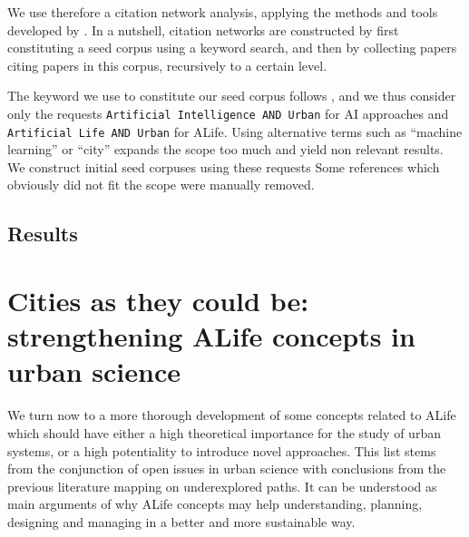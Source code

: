 \documentclass[letterpaper]{article}
\begin{document}
We use therefore a citation network analysis, applying the methods and tools developed by \cite{raimbault2019exploration}. In a nutshell, citation networks are constructed by first constituting a seed corpus using a keyword search, and then by collecting papers citing papers in this corpus, recursively to a certain level.

The keyword we use to constitute our seed corpus follows , and we thus consider only the requests \texttt{Artificial Intelligence AND Urban} for AI approaches and \texttt{Artificial Life AND Urban} for ALife. Using alternative terms such as ``machine learning'' or ``city'' expands the scope too much and yield non relevant results.
We construct initial seed corpuses using these requests
Some references which obviously did not fit the scope were manually removed. 


\subsection{Results}





\section{Cities as they could be: strengthening ALife concepts in urban science}


We turn now to a more thorough development of some concepts related to ALife which should have either a high theoretical importance for the study of urban systems, or a high potentiality to introduce novel approaches. This list stems from the conjunction of open issues in urban science \citep{lobo2020urban} with conclusions from the previous literature mapping on underexplored paths. It can be understood as main arguments of why ALife concepts may help understanding, planning, designing and managing in a better and more sustainable way.



\end{document}
